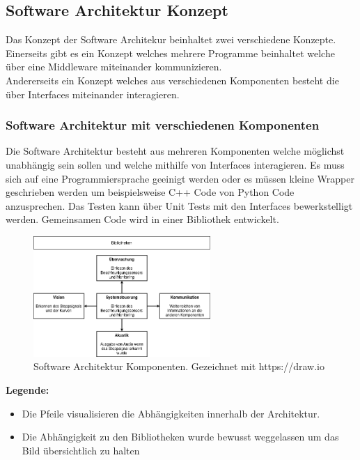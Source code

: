 \documentclass[../../main.tex]{subfiles}
\begin{document}
\subsection{Software Architektur Konzept}
Das Konzept der Software Architekur beinhaltet zwei verschiedene Konzepte.
Einerseits gibt es ein Konzept welches mehrere Programme beinhaltet welche über eine Middleware miteinander kommunizieren. \\
Andererseits ein Konzept welches aus verschiedenen Komponenten besteht die über Interfaces miteinander interagieren. \\

\subsubsection{Software Architektur mit verschiedenen Komponenten}
Die Software Architektur besteht aus mehreren Komponenten welche möglichst unabhängig sein sollen und welche mithilfe von Interfaces interagieren.
Es muss sich auf eine Programmiersprache geeinigt werden oder es müssen kleine Wrapper geschrieben werden um beispielsweise
C++ Code von Python Code anzusprechen. Das Testen kann über Unit Tests mit den Interfaces bewerkstelligt werden.
Gemeinsamen Code wird in einer Bibliothek entwickelt.

\begin{figure}[H] %
    \centering
    \includegraphics[width=0.6\textwidth]{../../drawings/ArchitekturDiagramm/SW_Architektur.png}
    \caption {Software Architektur Komponenten. Gezeichnet mit https://draw.io}
\end{figure}

\textbf{Legende:}
\begin{itemize}
    \item Die Pfeile visualisieren die Abhängigkeiten innerhalb der Architektur.
    \item Die Abhängigkeit zu den Bibliotheken wurde bewusst weggelassen um das Bild übersichtlich zu halten
\end{itemize}
\end{document}
